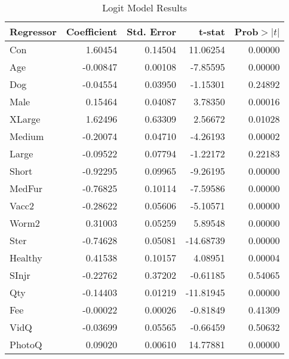 \documentclass[12pt]{article}
\begin{document}
	\begin{table}[h]
		\centering
		\caption{Logit Model Results}
		\begin{tabular}{@{}lrrrr@{}}
			\toprule
			Regressor & Coefficient & Std. Error & t-stat    & Prob$ >|t| $ \\ \midrule
			Con       & 1.60454     & 0.14504    & 11.06254  & 0.00000  \\
			Age       & -0.00847    & 0.00108    & -7.85595  & 0.00000  \\
			Dog       & -0.04554    & 0.03950    & -1.15301  & 0.24892  \\
			Male      & 0.15464     & 0.04087    & 3.78350   & 0.00016  \\
			XLarge    & 1.62496     & 0.63309    & 2.56672   & 0.01028  \\
			Medium    & -0.20074    & 0.04710    & -4.26193  & 0.00002  \\
			Large     & -0.09522    & 0.07794    & -1.22172  & 0.22183  \\
			Short     & -0.92295    & 0.09965    & -9.26195  & 0.00000  \\
			MedFur    & -0.76825    & 0.10114    & -7.59586  & 0.00000  \\
			Vacc2     & -0.28622    & 0.05606    & -5.10571  & 0.00000  \\
			Worm2     & 0.31003     & 0.05259    & 5.89548   & 0.00000  \\
			Ster      & -0.74628    & 0.05081    & -14.68739 & 0.00000  \\
			Healthy   & 0.41538     & 0.10157    & 4.08951   & 0.00004  \\
			SInjr     & -0.22762    & 0.37202    & -0.61185  & 0.54065  \\
			Qty       & -0.14403    & 0.01219    & -11.81945 & 0.00000  \\
			Fee       & -0.00022    & 0.00026    & -0.81849  & 0.41309  \\
			VidQ      & -0.03699    & 0.05565    & -0.66459  & 0.50632  \\
			PhotoQ    & 0.09020     & 0.00610    & 14.77881  & 0.00000  \\ \bottomrule
		\end{tabular}
		\label{table:4}
	\end{table}
			
\end{document}
